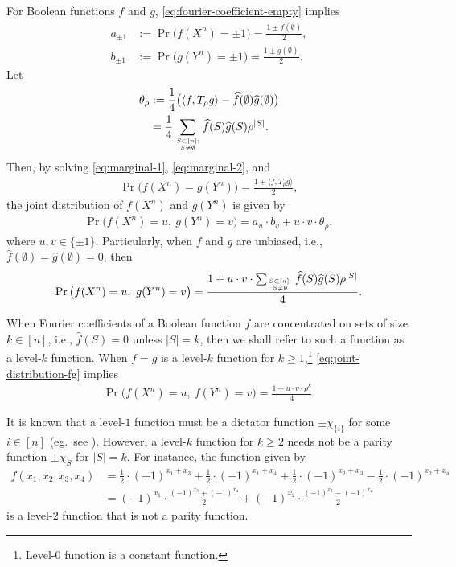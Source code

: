 \documentclass[journal,draftcls, onecolumn]{IEEEtran}
\begin{document}
For Boolean functions $f$ and $g$,
\eqref{eq:fourier-coefficient-empty} implies
\begin{align}
a_{\pm 1} &:= \Pr\big( f(X^n) = \pm 1 \big) = \frac{1\pm \widehat{f}(\emptyset)}{2}, \label{eq:marginal-1} \\
b_{\pm 1} &:= \Pr\big( g(Y^n) = \pm 1 \big) = \frac{1 \pm \widehat{g}(\emptyset)}{2}. \label{eq:marginal-2}
\end{align}
Let
\begin{align}
\theta_\rho &:= \frac{1}{4}\big( \langle f, T_\rho g \rangle - \widehat{f}(\emptyset) \widehat{g}(\emptyset) \big) \label{eq:theta-definition} \\
&= \frac{1}{4} \sum_{S \subset [n]: \atop S \neq \emptyset} \widehat{f}(S) \widehat{g}(S) \rho^{|S|} . \label{eq:theta-definition-2} 
\end{align}
Then, by solving \eqref{eq:marginal-1}, \eqref{eq:marginal-2}, and 
\begin{align*}
\Pr\big( f(X^n) = g(Y^n) \big) = \frac{1+\langle f, T_\rho g \rangle}{2},
\end{align*}
the joint distribution of $f(X^n)$ and $g(Y^n)$ is given by
\begin{align} \label{eq:joint-distribution-fg}
\Pr\big( f(X^n) = u,~g(Y^n)=v \big) = a_u \cdot b_v + u\cdot v \cdot \theta_\rho, 
\end{align}
where $u,v \in \{\pm 1\}$. Particularly, when $f$ and $g$ are unbiased, i.e., $\widehat{f}(\emptyset)=\widehat{g}(\emptyset)=0$, then
\begin{align} \label{eq:joint-distribution-fg-unbiased}
\Pr\big( f(X^n) = u,~g(Y^n)=v \big) = \frac{1 + u\cdot v \cdot \sum_{S\subset [n]:\atop S\neq \emptyset }  \widehat{f}(S)\widehat{g}(S) \rho^{|S|}}{4}.
\end{align}

When Fourier coefficients of a Boolean function $f$ are concentrated on sets of size $k \in [n]$, i.e., $\widehat{f}(S) = 0$ unless $|S|=k$,
then we shall refer to such a function as a level-$k$ function. 
When $f=g$ is a level-$k$ function for $k\ge 1$,\footnote{Level-$0$ function is a constant function.} \eqref{eq:joint-distribution-fg} implies
\begin{align} \label{eq:joint-of-level-k-function}
\Pr\big( f(X^n) = u,~f(Y^n) = v \big) = \frac{1+u\cdot v \cdot \rho^k}{4}.
\end{align}

It is known that a level-$1$ function must be 
a dictator function $\pm \chi_{\{i\}}$ 
for some $i \in [n]$ (eg.~see \cite[Exercise 1.19]{ODonnell-book}). However, a level-$k$ function for $k \ge 2$ needs not be 
a parity function $\pm \chi_S$ for $|S|=k$. For instance, the function given by
\begin{align*}
f(x_1,x_2,x_3,x_4) &= \frac{1}{2} \cdot (-1)^{x_1+x_3} + \frac{1}{2} \cdot (-1)^{x_1+x_4} + \frac{1}{2}\cdot (-1)^{x_2+x_3} - \frac{1}{2} \cdot (-1)^{x_2+x_4} \\
&= (-1)^{x_1} \cdot \frac{(-1)^{x_3} + (-1)^{x_4}}{2} + (-1)^{x_2} \cdot \frac{(-1)^{x_3} - (-1)^{x_4}}{2}
\end{align*}
is a level-$2$ function that is not a parity function. 
\end{document}
